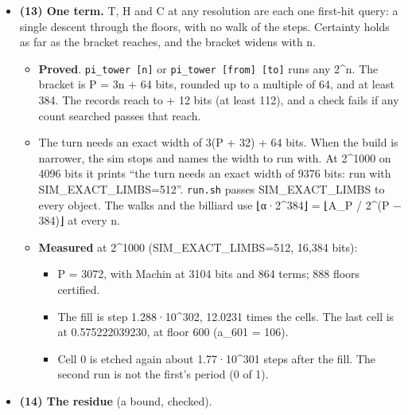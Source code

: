 \begin{itemize}
\item \textbf{(13) One term.} T, H and C at any resolution are each one first-hit query: a single descent through the floors, with no walk of the steps. Certainty holds as far as the bracket reaches, and the bracket widens with n.

\begin{itemize}
\item \textbf{Proved}. \texttt{pi\_\allowbreak{}tower [n]} or \texttt{pi\_\allowbreak{}tower [from] [to]} runs any 2\textasciicircum{}n. The bracket is P = 3n + 64 bits, rounded up to a multiple of 64, and at least 384. The records reach to + 12 bits (at least 112), and a check fails if any count searched passes that reach.
\item The turn needs an exact width of 3(P + 32) + 64 bits. When the build is narrower, the sim stops and names the width to run with. At 2\textasciicircum{}1000 on 4096 bits it prints “the turn needs an exact width of 9376 bits: run with SIM\_\allowbreak{}EXACT\_\allowbreak{}LIMBS=512”. \texttt{run.\allowbreak{}sh} passes SIM\_\allowbreak{}EXACT\_\allowbreak{}LIMBS to every object. The walks and the billiard use ⌊α·2\textasciicircum{}384⌋ = ⌊A\_\allowbreak{}P / 2\textasciicircum{}(P − 384)⌋ at every n.
\item \textbf{Measured} at 2\textasciicircum{}1000 (SIM\_\allowbreak{}EXACT\_\allowbreak{}LIMBS=512, 16,384 bits):

\begin{itemize}
\item P = 3072, with Machin at 3104 bits and 864 terms; 888 floors certified.
\item The fill is step 1.288·10\textasciicircum{}302, 12.0231 times the cells. The last cell is at 0.575222039230, at floor 600 (a\_\allowbreak{}601 = 106).
\item Cell 0 is etched again about 1.77·10\textasciicircum{}301 steps after the fill. The second run is not the first's period (0 of 1).
\end{itemize}
\end{itemize}
\item \textbf{(14) The residue} (a bound, checked).


\end{itemize}
